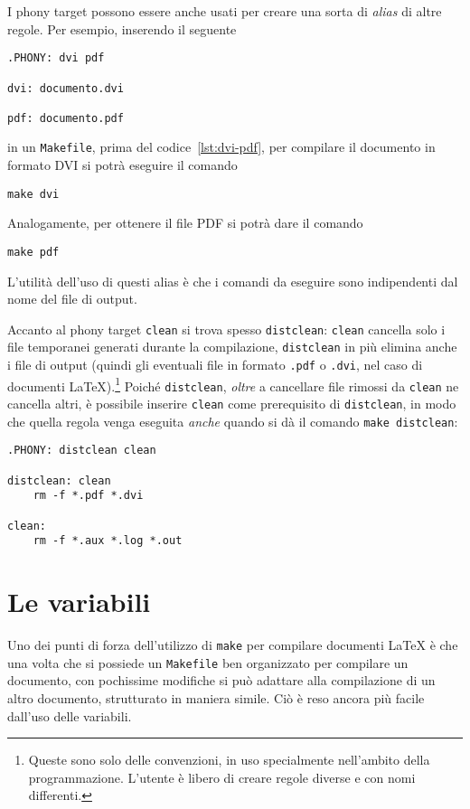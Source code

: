I phony target possono essere anche usati per creare una sorta di \emph{alias}
di altre regole.  Per esempio, inserendo il seguente
\begin{lstlisting}[caption={I prerequisiti della regola dell'obiettivo
\texttt{.PHONY} sono i nomi dei phony target che vengono successivamente
specificati.},label=lst:phony]
.PHONY: dvi pdf

dvi: documento.dvi

pdf: documento.pdf
\end{lstlisting}
in un \verb|Makefile|, prima del codice~\ref{lst:dvi-pdf}, per compilare il
documento in formato \textsc{DVI} si potrà eseguire il comando
\begin{verbatim}
make dvi
\end{verbatim}
Analogamente, per ottenere il file \textsc{PDF} si potrà dare il comando
\begin{verbatim}
make pdf
\end{verbatim}
L'utilità dell'uso di questi alias è che i comandi da eseguire sono indipendenti
dal nome del file di output.

Accanto al phony target \verb|clean| si trova spesso \verb|distclean|:
\verb|clean| cancella solo i file temporanei generati durante la compilazione,
\verb|distclean| in più elimina anche i file di output (quindi gli eventuali
file in formato \verb|.pdf| o \verb|.dvi|, nel caso di documenti
\LaTeX).\footnote{Queste sono solo delle convenzioni, in uso specialmente
  nell'ambito della programmazione.  L'utente è libero di creare regole diverse
  e con nomi differenti.}
Poiché \verb|distclean|, \emph{oltre} a cancellare file rimossi da \verb|clean|
ne cancella altri, è possibile inserire \verb|clean| come prerequisito di
\verb|distclean|, in modo che quella regola venga eseguita \emph{anche} quando
si dà il comando \verb|make distclean|:
\begin{lstlisting}[caption={Phony target \texttt{distclean} e \texttt{clean}.},
label=lst:distclean]
.PHONY: distclean clean

distclean: clean
	rm -f *.pdf *.dvi

clean:
	rm -f *.aux *.log *.out
\end{lstlisting}


\section{Le variabili}
\label{sec:variabili}

Uno dei punti di forza dell'utilizzo di \verb|make| per compilare documenti
\LaTeX{}
è che una volta che si possiede un \verb|Makefile| ben organizzato per compilare
un documento, con pochissime modifiche si può adattare alla compilazione di un
altro documento, strutturato in maniera simile.  Ciò è reso ancora più facile
dall'uso delle variabili.

